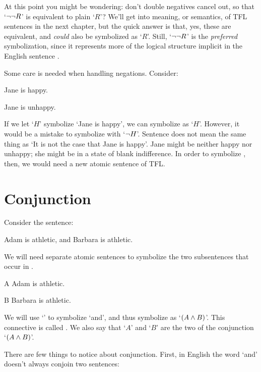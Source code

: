 At this point you might be wondering: don't double negatives cancel out, so that `$\neg\neg R$' is equivalent to plain `$R$'? We'll get into meaning, or semantics, of TFL sentences in the next chapter, but the quick answer is that, yes, these are equivalent, and  \emph{could} also be symbolized as `$R$'.  Still, `$\neg \neg R$' is the \emph{preferred} symbolization, since it represents more of the logical structure implicit in the English sentence .

Some care is needed when handling negations. Consider:
	\begin{earg}
		\item[\ex{not6}] Jane is happy.
		\item[\ex{not7}] Jane is unhappy.
	\end{earg}
If we let `$H$' symbolize  `Jane is happy', we can symbolize  as `$H$'. However, it would be a mistake to symbolize  with `$\neg{H}$'. Sentence  does not mean the same thing as `It is not the case that Jane is happy'. Jane might be neither happy nor unhappy; she might be in a state of blank indifference. In order to symbolize , then, we would need a new atomic sentence of TFL.

\section{Conjunction}\label{s:ConnectiveConjunction}

Consider the sentence:
	
	\begin{earg}
		\item[\ex{and3}]Adam is athletic, and Barbara is athletic.
	\end{earg}

We will need separate atomic sentences to symbolize the two subsentences that occur in .

	\begin{ekey}
		\item[A] Adam is athletic.
		\item[B] Barbara is athletic.
	\end{ekey}

We will use `\eand' to symbolize `and', and thus symbolize  as `$(A\wedge B)$'. This connective is called . We also say that `$A$' and `$B$' are the two  of the conjunction `$(A \wedge B)$'.

There are few things to notice about conjunction.  First, in English the word `and' doesn't always conjoin two sentences:
	

